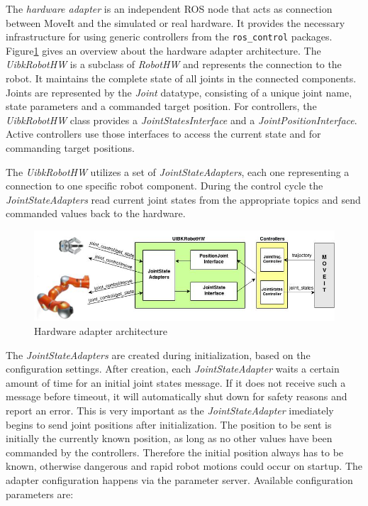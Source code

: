The \emph{hardware adapter} is an independent ROS node that acts as connection between MoveIt and the simulated or real hardware. It provides the necessary infrastructure for using generic controllers from the \texttt{ros\_control} packages. Figure\ref{fig:hardware_adapter} gives an overview about the hardware adapter architecture. The \emph{UibkRobotHW} is a subclass of \emph{RobotHW} and represents the connection to the robot. It maintains the complete state of all joints in the connected components. Joints are represented by the \emph{Joint} datatype, consisting of a unique joint name, state parameters and a commanded target position. For controllers, the \emph{UibkRobotHW} class provides a \emph{JointStatesInterface} and a \emph{JointPositionInterface}. Active controllers use those interfaces to access the current state and for commanding target positions. 

The \emph{UibkRobotHW} utilizes a set of \emph{JointStateAdapters}, each one representing a connection to one specific robot component. During the control cycle the \emph{JointStateAdapters} read current joint states from the appropriate topics and send commanded values back to the hardware.
\begin{figure}[h]
	\centering
  	\includegraphics[width=1.0\textwidth]{images/hardware_adapter.jpg}
	\caption{Hardware adapter architecture}
	\label{fig:hardware_adapter}
\end{figure}
The \emph{JointStateAdapters} are created during initialization, based on the configuration settings. After creation, each \emph{JointStateAdapter} waits a certain amount of time for an initial joint states message. If it does not receive such a message before timeout, it will automatically shut down for safety reasons and report an error. This is very important as the \emph{JointStateAdapter} imediately begins to send joint positions after initialization. The position to be sent is initially the currently known position, as long as no other values have been commanded by the controllers. Therefore the initial position always has to be known, otherwise dangerous and rapid robot motions could occur on startup. The adapter configuration happens via the parameter server. Available configuration parameters are:

